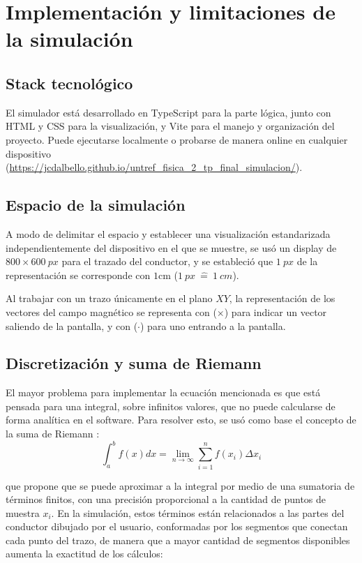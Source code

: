 \documentclass[12pt,a4paper]{article}
\begin{document}
\section{Implementación y limitaciones de la simulación}

\subsection{Stack tecnológico}
El simulador está desarrollado en TypeScript para la parte lógica, junto con HTML y CSS para la visualización, y Vite para el manejo y organización del proyecto. Puede ejecutarse localmente o probarse de manera online en cualquier dispositivo \\ (\url{https://jcdalbello.github.io/untref_fisica_2_tp_final_simulacion/}).

\subsection{Espacio de la simulación}
A modo de delimitar el espacio y establecer una visualización estandarizada independientemente del dispositivo en el que se muestre, se usó un display de $800 \times 600 \ \si{px}$ para el trazado del conductor, y se estableció que $1 \ \si{px}$ de la representación se corresponde con $1$cm ($1 \ \si{px} \ \widehat{=} \ 1 \ \si{cm}$).

Al trabajar con un trazo únicamente en el plano $XY$, la representación de los vectores del campo magnético se representa con ($\times$) para indicar un vector saliendo de la pantalla, y con ($\cdot$) para uno entrando a la pantalla.

\subsection{Discretización y suma de Riemann}
El mayor problema para implementar la ecuación mencionada es que está pensada para una integral, sobre infinitos valores, que no puede calcularse de forma analítica en el software. Para resolver esto, se usó como base el concepto de la suma de Riemann \cite{stewart}:
\begin{equation}
    \int_{a}^{b} f(x) dx = \lim_{n \to \infty} \sum_{i=1}^n f(x_i) \Delta x_i
\end{equation}

que propone que se puede aproximar a la integral por medio de una sumatoria de términos finitos, con una precisión proporcional a la cantidad de puntos de muestra $x_i$. En la simulación, estos términos están relacionados a las partes del conductor dibujado por el usuario, conformadas por los segmentos que conectan cada punto del trazo, de manera que a mayor cantidad de segmentos disponibles aumenta la exactitud de los cálculos:
\end{document}

